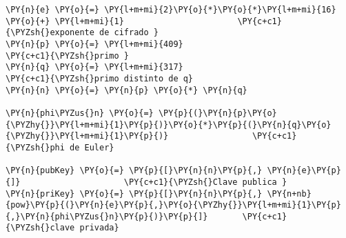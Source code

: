 

\begin{Verbatim}[commandchars=\\\{\}]
\PY{n}{e} \PY{o}{=} \PY{l+m+mi}{2}\PY{o}{*}\PY{o}{*}\PY{l+m+mi}{16} \PY{o}{+} \PY{l+m+mi}{1}                       \PY{c+c1}{\PYZsh{}exponente de cifrado }
\PY{n}{p} \PY{o}{=} \PY{l+m+mi}{409}                             \PY{c+c1}{\PYZsh{}primo }
\PY{n}{q} \PY{o}{=} \PY{l+m+mi}{317}                             \PY{c+c1}{\PYZsh{}primo distinto de q}
\PY{n}{n} \PY{o}{=} \PY{n}{p} \PY{o}{*} \PY{n}{q}                           

\PY{n}{phi\PYZus{}n} \PY{o}{=} \PY{p}{(}\PY{n}{p}\PY{o}{\PYZhy{}}\PY{l+m+mi}{1}\PY{p}{)}\PY{o}{*}\PY{p}{(}\PY{n}{q}\PY{o}{\PYZhy{}}\PY{l+m+mi}{1}\PY{p}{)}                 \PY{c+c1}{\PYZsh{}phi de Euler}

\PY{n}{pubKey} \PY{o}{=} \PY{p}{[}\PY{n}{n}\PY{p}{,} \PY{n}{e}\PY{p}{]}                     \PY{c+c1}{\PYZsh{}Clave publica }
\PY{n}{priKey} \PY{o}{=} \PY{p}{[}\PY{n}{n}\PY{p}{,} \PY{n+nb}{pow}\PY{p}{(}\PY{n}{e}\PY{p}{,}\PY{o}{\PYZhy{}}\PY{l+m+mi}{1}\PY{p}{,}\PY{n}{phi\PYZus{}n}\PY{p}{)}\PY{p}{]}       \PY{c+c1}{\PYZsh{}clave privada}
\end{Verbatim}

